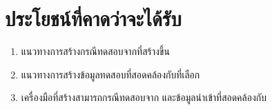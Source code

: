 \section{ประโยชน์ที่คาดว่าจะได้รับ}

\begin{enumerate}
    \item แนวทางการสร้างกรณีทดสอบจาก{\scg}ที่สร้างขึ้น
    \item แนวทางการสร้างข้อมูลทดสอบที่สอดคล้องกับ{\TestPath}ที่เลือก
    \item เครื่องมือที่สร้างสามารถกรณีทดสอบจาก{\scg} และข้อมูลนำเข้าที่สอดคล้องกับ{\TestPath}
\end{enumerate}
